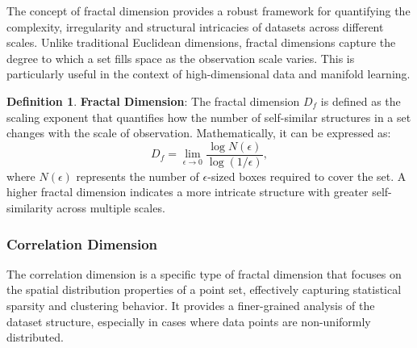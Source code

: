 \documentclass{article}
\theoremstyle{plain}
\theoremstyle{definition}
\newtheorem{definition}[theorem]{Definition}
\theoremstyle{remark}
\begin{document}
The concept of fractal dimension provides a robust framework for quantifying the complexity, irregularity and structural intricacies of datasets across different scales. Unlike traditional Euclidean dimensions, fractal dimensions capture the degree to which a set fills space as the observation scale varies. This is particularly useful in the context of high-dimensional data and manifold learning.

\begin{definition}
\textbf{Fractal Dimension}: The fractal dimension $D_f$ is defined as the scaling exponent that quantifies how the number of self-similar structures in a set changes with the scale of observation. Mathematically, it can be expressed as:
\begin{equation}
D_f = \lim_{\epsilon \to 0} \frac{\log N(\epsilon)}{\log (1/\epsilon)},
\end{equation}
where $N(\epsilon)$ represents the number of $\epsilon$-sized boxes required to cover the set.
A higher fractal dimension indicates a more intricate structure with greater self-similarity across multiple scales.
\end{definition}

\subsubsection{Correlation Dimension}

The correlation dimension is a specific type of fractal dimension that focuses on the spatial distribution properties of a point set, effectively capturing statistical sparsity and clustering behavior. It provides a finer-grained analysis of the dataset structure, especially in cases where data points are non-uniformly distributed.
\end{document}
